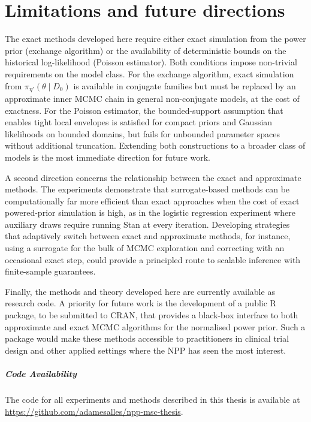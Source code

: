 \section{Limitations and future directions}

The exact methods developed here require either exact simulation from the power prior (exchange algorithm) or the availability of deterministic bounds on the historical log-likelihood (Poisson estimator).
Both conditions impose non-trivial requirements on the model class.
For the exchange algorithm, exact simulation from $\pi_{\eta'}(\theta \mid D_0)$ is available in conjugate families but must be replaced by an approximate inner MCMC chain in general non-conjugate models, at the cost of exactness.
For the Poisson estimator, the bounded-support assumption that enables tight local envelopes is satisfied for compact priors and Gaussian likelihoods on bounded domains, but fails for unbounded parameter spaces without additional truncation.
Extending both constructions to a broader class of models is the most immediate direction for future work.

A second direction concerns the relationship between the exact and approximate methods.
The experiments demonstrate that surrogate-based methods can be computationally far more efficient than exact approaches when the cost of exact powered-prior simulation is high, as in the logistic regression experiment where auxiliary draws require running Stan at every iteration.
Developing strategies that adaptively switch between exact and approximate methods, for instance, using a surrogate for the bulk of MCMC exploration and correcting with an occasional exact step, could provide a principled route to scalable inference with finite-sample guarantees.

Finally, the methods and theory developed here are currently available as research code.
A priority for future work is the development of a public \textsf{R} package, to be submitted to CRAN, that provides a black-box interface to both approximate and exact MCMC algorithms for the normalised power prior.
Such a package would make these methods accessible to practitioners in clinical trial design and other applied settings where the NPP has seen the most interest.

\vspace{1em}
\subparagraph*{Code Availability}
The code for all experiments and methods described in this thesis is available at \url{https://github.com/adamesalles/npp-msc-thesis}.
